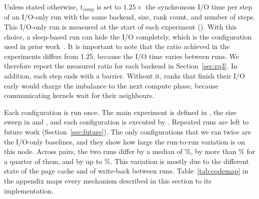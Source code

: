 Unless stated otherwise, $t_{comp}$ is set to $1.25\times$ the synchronous
I/O time per step of an I/O-only run with the same backend, size, rank count,
and number of steps. This I/O-only run is measured at the start of each
experiment (\srcIoBaseline). With this choice, a sleep-based run can hide
the I/O completely, which is the configuration used in prior
work~\cite{tang2022async,ravi2023evaluating}. It is important to note that
the ratio achieved in the experiments differs from 1.25, because the I/O
time varies between runs. We therefore report the measured ratio for each
backend in Section~\ref{sec:rq3}. In addition, each step ends with a barrier.
Without it, ranks that finish their I/O early would charge the imbalance to
the next compute phase, because communicating kernels wait for their
neighbours.

Each configuration is run once. The main experiment is defined in
\srcPhaseMain, the size sweep in \srcPhaseSize and \srcPhaseSizeLarge, and
each configuration is executed by \srcRunOne. Repeated runs are left to
future work (Section~\ref{sec:future}). The only configurations that we ran
twice are the I/O-only baselines, and they show how large the run-to-run
variation is on this node. Across \VarPairs pairs, the two runs differ by a
median of \VarMedian\%, by more than \VarPseventyfive\% for a quarter of
them, and by up to \VarMax\%. This variation is mostly due to the different
state of the page cache and of write-back between runs.
Table~\ref{tab:codemap} in the appendix maps every mechanism described in
this section to its implementation.

